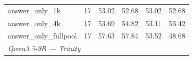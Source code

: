 \begin{table}[t]
{\begin{tabular}{lrrrrr}
answer\_only\_1k & 17 & 53.02 & 52.68 & 53.02 & 52.68 \\
answer\_only\_4k & 17 & 53.69 & 54.82 & 53.11 & 53.42 \\
answer\_only\_fullpool & 17 & 57.63 & 57.84 & 53.52 & 48.68 \\
\midrule
\multicolumn{6}{l}{\textit{Qwen3.5-9B --- Trinity}} \\

\end{tabular}}
\end{table}
